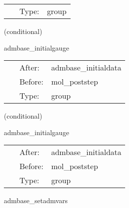 \documentclass{article}
\begin{document}
 \begin{tabular*}{160mm}{cll} 
~ & Type:  & group \\ 
\end{tabular*} 


\vspace{5mm}

   (conditional) 

\hspace{5mm} admbase\_initialgauge 

\hspace{5mm}{\it schedule group for the adm initial gauge condition } 


\hspace{5mm}

 \begin{tabular*}{160mm}{cll} 
~ & After:  & admbase\_initialdata \\ 
~ & Before:  & mol\_poststep \\ 
~ & Type:  & group \\ 
\end{tabular*} 


\vspace{5mm}

   (conditional) 

\hspace{5mm} admbase\_initialgauge 

\hspace{5mm}{\it schedule group for the adm initial gauge condition } 


\hspace{5mm}

 \begin{tabular*}{160mm}{cll} 
~ & After:  & admbase\_initialdata \\ 
~ & Before:  & mol\_poststep \\ 
~ & Type:  & group \\ 
\end{tabular*} 


\vspace{5mm}


\hspace{5mm} admbase\_setadmvars 

\hspace{5mm}{\it set the adm variables before this group, and use them afterwards } 


\hspace{5mm}
\end{document}
